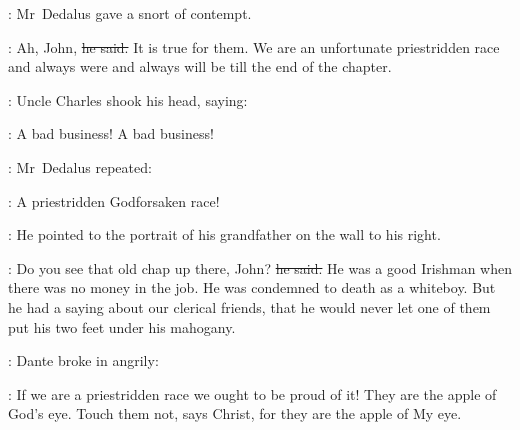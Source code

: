 \begin{comment}

    \StephenInt:
    It was not nice
    about the spit in the woman’s eye.

    \StephenInt:
    But what was the name the woman had called Kitty O’Shea
    that Mr~Casey would not repeat?

    \N2:
    He thought of Mr~Casey walking through the crowds of people
    and making speeches from a wagonette.
    That was what he had been in prison for
    and he remembered that one night
    Sergeant O’Neill had come to the house
    and had stood in the hall,
    talking in a low voice with his father
    and chewing nervously at the chinstrap of his cap.
    And that night
    Mr~Casey had not gone to Dublin by train
    but a car had come to the door
    and he had heard his father say something
    about the Cabinteely road.

    \N2:
    He was for Ireland and Parnell and so was his father:
    and so was Dante too
    for one night at the band on the esplanade
    she had hit a gentleman on the head with her umbrella
    because he had taken off his hat
    when the band played God save the Queen at the end.

\end{comment}


:
Mr~Dedalus gave a snort of contempt.

\simon:
Ah, John,
\sout{he said.}
It is true for them.
We are an unfortunate priest\-ridden race
and always were
and always will be
till the end of the chapter.

:
Uncle Charles shook his head,
saying:

\charles:
A bad business!
A bad business!

:
Mr~Dedalus repeated:

\simon:
A priest\-ridden Godforsaken race!

:
He pointed to the portrait of his grandfather
on the wall to his right.

\simon:
Do you see that old chap up there, John?
\sout{he said.}
He was a good Irishman when there was no money in the job.
He was condemned to death as a whiteboy.
But he had a saying about our clerical friends,
that he would never let one of them
put his two feet under his mahogany.

:
Dante broke in angrily:

\dante:
If we are a priest\-ridden race
we ought to be proud of it!
They are the apple of God’s eye.
Touch them not,
says Christ,
for they are the apple of My eye.

